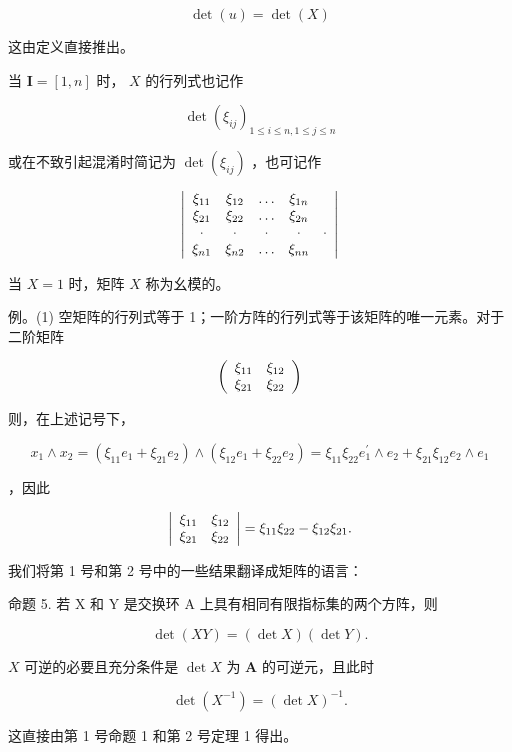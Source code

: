 \[
\det (u) = \det (X)\tag{7}
\]

这由定义直接推出。

当 \(\mathbf{I} = [1, n]\) 时， \(X\) 的行列式也记作

\[
\det (\xi_ {i j}) _ {1 \leqslant i \leqslant n, 1 \leqslant j \leqslant n}
\]

或在不致引起混淆时简记为 \(\operatorname{det}(\xi_{ij})\) ，也可记作

\[
\left| \begin{array}{c c c c c} \xi_ {1 1} & \xi_ {1 2} & \ldots & \xi_ {1 n} \\ \xi_ {2 1} & \xi_ {2 2} & \ldots & \xi_ {2 n} \\ \cdot & \cdot & \cdot & \cdot & \cdot \\ \xi_ {n 1} & \xi_ {n 2} & \ldots & \xi_ {n n} \end{array} \right|
\]

当 \(X = 1\) 时，矩阵 \(X\) 称为幺模的。

例。(1) 空矩阵的行列式等于 1；一阶方阵的行列式等于该矩阵的唯一元素。对于二阶矩阵

\[
\left( \begin{array}{c c} \xi_ {1 1} & \xi_ {1 2} \\ \xi_ {2 1} & \xi_ {2 2} \end{array} \right)
\]

则，在上述记号下，

\[
x _ {1} \wedge x _ {2} = (\xi_ {1 1} e _ {1} + \xi_ {2 1} e _ {2}) \wedge (\xi_ {1 2} e _ {1} + \xi_ {2 2} e _ {2}) = \xi_ {1 1} \xi_ {2 2} e _ {1} ^ {\prime} \wedge e _ {2} + \xi_ {2 1} \xi_ {1 2} e _ {2} \wedge e _ {1}
\]

，因此

\[
\left| \begin{array}{c c} \xi_ {1 1} & \xi_ {1 2} \\ \xi_ {2 1} & \xi_ {2 2} \end{array} \right| = \xi_ {1 1} \xi_ {2 2} - \xi_ {1 2} \xi_ {2 1}.
\]

我们将第 1 号和第 2 号中的一些结果翻译成矩阵的语言：

命题 5. 若 X 和 Y 是交换环 A 上具有相同有限指标集的两个方阵，则

\[
\det (X Y) = (\det X) (\det Y).\tag{8}
\]

\(X\) 可逆的必要且充分条件是 \(\det X\) 为 \(\mathbf{A}\) 的可逆元，且此时

\[
\det (X ^ {- 1}) = (\det X) ^ {- 1}.\tag{9}
\]

这直接由第 1 号命题 1 和第 2 号定理 1 得出。

